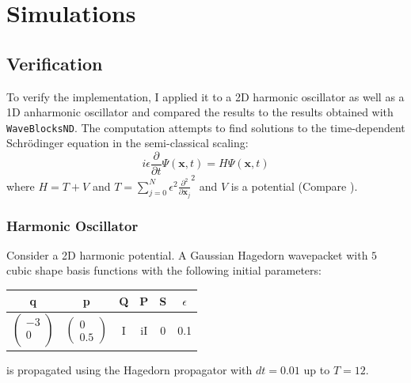 
\chapter{Simulations} %

\label{Chapter4} %



\section{Verification}
To verify the implementation, I applied it to a 2D harmonic oscillator as well as a 1D anharmonic oscillator and compared the results to the results obtained with \texttt{WaveBlocksND}.
The computation attempts to find solutions to the time-dependent Schr\"odinger equation in
the semi-classical scaling:
\begin{equation}
i \epsilon \frac{\partial}{\partial t}\Psi(\mathbf{x},t) = H \Psi(\mathbf{x},t)
\end{equation}
where $H = T + V$ and $T = \sum\limits_{j=0}^N \epsilon^2 \frac{\partial^2}{\partial \mathbf{x}_j}^2$ and $V$ is a potential (Compare \cite{GHJ_tunneling_spawning}).

\subsection{Harmonic Oscillator}
Consider a 2D harmonic potential.
A Gaussian Hagedorn wavepacket\cite{H_ladder_operators} with $5$ cubic shape basis functions with the following initial parameters:
\begin{center}
 \begin{tabular}{|c c c c c c|} 
 \hline
 q & p & Q & P & S & $\epsilon$\\ [0.5ex] 
 \hline
 $\begin{pmatrix}
 -3\\
 0\\
 \end{pmatrix}$ & $\begin{pmatrix} 0 \\ 0.5 \end{pmatrix}$ & I & iI & 0 & 0.1\\ 
 \hline
\end{tabular}
\end{center}
is propagated using the Hagedorn propagator with $dt = 0.01$ up to $T = 12$.



